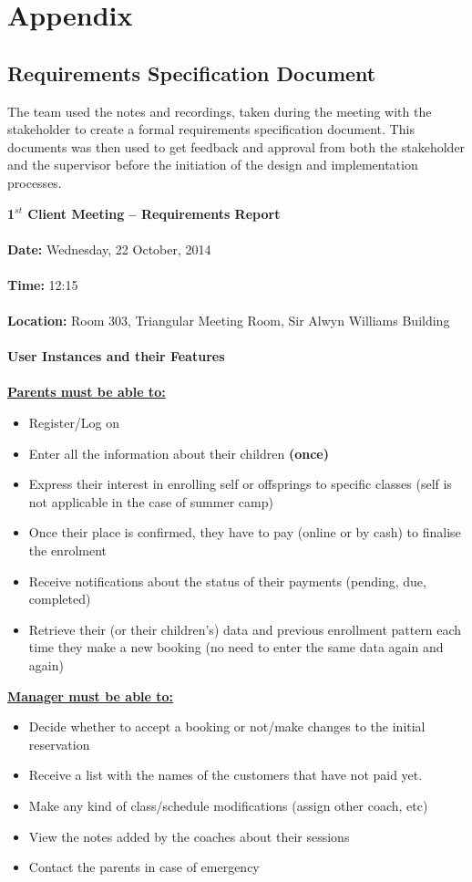 \documentclass{l3proj}
\begin{document}
\chapter{Appendix}
\label{appendix}
\section{Requirements Specification Document}
The team used the notes and recordings, taken during the meeting with the stakeholder to create a formal requirements specification document. This documents was then used to get feedback and approval from both the stakeholder and the supervisor before the initiation of the design and implementation processes.

\textbf{\LARGE{1$^{st}$ Client Meeting -- Requirements Report}}\\
\\
\textbf{Date:} Wednesday, 22 October, 2014\\
\\
\textbf{Time:} 12:15\\
\\
\textbf{Location:} Room 303, Triangular Meeting Room, Sir Alwyn Williams Building\\
\\
\textbf{\Large{User Instances and their Features}}\\
\\
\textbf{\underline{Parents must be able to:}}
	\begin{itemize}
	\item Register/Log on
	\item Enter all the information about their children \textbf{(once)}
	\item Express their interest in enrolling self or offsprings to specific classes (self is not applicable in the case of summer camp)
	\item Once their place is confirmed, they have to pay (online or by cash) to finalise the enrolment
	\item Receive notifications about the status of their payments (pending, due, completed)
	\item Retrieve their (or their children's) data and previous enrollment pattern each time they make a new booking (no need to enter the same data again and again)
	\end{itemize}
\textbf{\underline{Manager must be able to:}}
	\begin{itemize}
	\item Decide whether to accept a booking or not/make changes to the initial reservation
	\item Receive a list with the names of the customers that have not paid yet.
	\item Make any kind of class/schedule modifications (assign other coach, etc)
	\item View the notes added by the coaches about their sessions
	\item Contact the parents in case of emergency
	\end{itemize}
\end{document}
